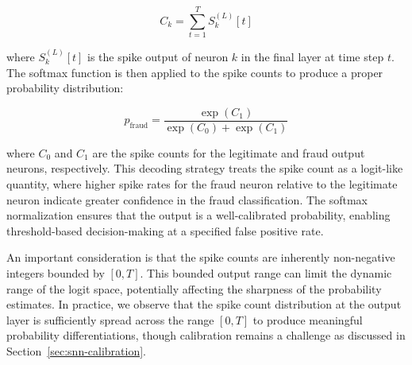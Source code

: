 \begin{equation}
C_k = \sum_{t=1}^{T} S_k^{(L)}[t]
\label{eq:snn-spike-count}
\end{equation}

where $S_k^{(L)}[t]$ is the spike output of neuron $k$ in the final layer at time step $t$. The softmax function is then applied to the spike counts to produce a proper probability distribution:

\begin{equation}
p_{\text{fraud}} = \frac{\exp(C_1)}{\exp(C_0) + \exp(C_1)}
\label{eq:snn-output-decoding}
\end{equation}

where $C_0$ and $C_1$ are the spike counts for the legitimate and fraud output neurons, respectively. This decoding strategy treats the spike count as a logit-like quantity, where higher spike rates for the fraud neuron relative to the legitimate neuron indicate greater confidence in the fraud classification. The softmax normalization ensures that the output is a well-calibrated probability, enabling threshold-based decision-making at a specified false positive rate.

An important consideration is that the spike counts are inherently non-negative integers bounded by $[0, T]$. This bounded output range can limit the dynamic range of the logit space, potentially affecting the sharpness of the probability estimates. In practice, we observe that the spike count distribution at the output layer is sufficiently spread across the range $[0, T]$ to produce meaningful probability differentiations, though calibration remains a challenge as discussed in Section~\ref{sec:snn-calibration}.

